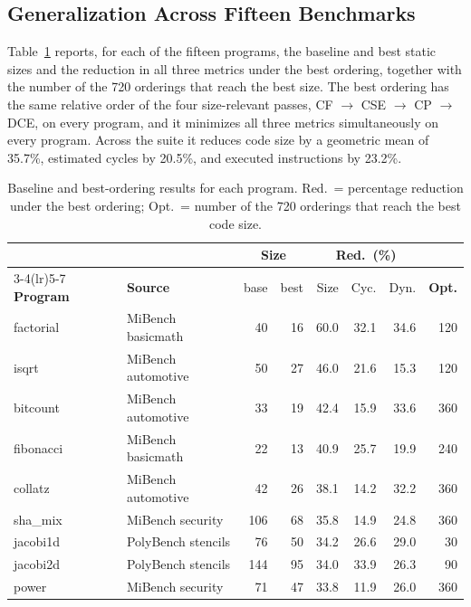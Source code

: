\documentclass[conference]{IEEEtran}
\begin{document}
\subsection{Generalization Across Fifteen Benchmarks}
\label{sec:classes}
Table~\ref{tab:per_program} reports, for each of the fifteen programs, the baseline and best static sizes and the reduction in all three metrics under the best ordering, together with the number of the 720 orderings that reach the best size. The best ordering has the same relative order of the four size-relevant passes, CF $\to$ CSE $\to$ CP $\to$ DCE, on every program, and it minimizes all three metrics simultaneously on every program. Across the suite it reduces code size by a geometric mean of 35.7\%, estimated cycles by 20.5\%, and executed instructions by 23.2\%.

\begin{table}[!htbp]
\centering
\caption{Baseline and best-ordering results for each program. Red.\ = percentage reduction under the best ordering; Opt.\ = number of the 720 orderings that reach the best code size.}
\label{tab:per_program}
\renewcommand{\arraystretch}{1.1}
{\footnotesize
\setlength{\tabcolsep}{3pt}
\begin{tabular}{@{}llrrrrrr@{}}
\toprule
 & & \multicolumn{2}{c}{\textbf{Size}} & \multicolumn{3}{c}{\textbf{Red.\ (\%)}} & \\
\cmidrule(lr){3-4}\cmidrule(lr){5-7}
\textbf{Program} & \textbf{Source} & base & best & Size & Cyc. & Dyn. & \textbf{Opt.} \\
\midrule
factorial & MiBench basicmath   & 40  & 16  & 60.0 & 32.1 & 34.6 & 120 \\
isqrt     & MiBench automotive  & 50  & 27  & 46.0 & 21.6 & 15.3 & 120 \\
bitcount  & MiBench automotive  & 33  & 19  & 42.4 & 15.9 & 33.6 & 360 \\
fibonacci & MiBench basicmath   & 22  & 13  & 40.9 & 25.7 & 19.9 & 240 \\
collatz   & MiBench automotive  & 42  & 26  & 38.1 & 14.2 & 32.2 & 360 \\
sha\_mix  & MiBench security    & 106 & 68  & 35.8 & 14.9 & 24.8 & 360 \\
jacobi1d  & PolyBench stencils  & 76  & 50  & 34.2 & 26.6 & 29.0 & 30 \\
jacobi2d  & PolyBench stencils  & 144 & 95  & 34.0 & 33.9 & 26.3 & 90 \\
power     & MiBench security    & 71  & 47  & 33.8 & 11.9 & 26.0 & 360 \\

\end{tabular}}
\end{table}
\end{document}
